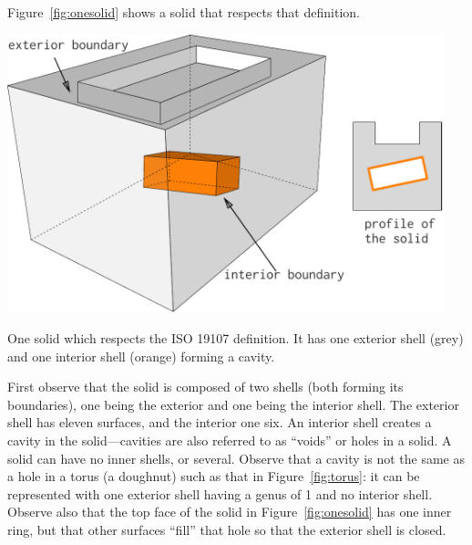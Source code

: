 Figure~\ref{fig:onesolid} shows a solid that respects that definition.
\begin{marginfigure}
  \centering
  \includegraphics[width=0.95\textwidth]{figs/isosolid.pdf}
  \caption{One solid which respects the ISO 19107 definition. It has one exterior shell (grey) and one interior shell (orange) forming a cavity.}%
\label{fig:onesolid}
\end{marginfigure}
First observe that the solid is composed of two shells (both forming its boundaries), one being the exterior and one being the interior shell.
The exterior shell has eleven surfaces, and the interior one six.
An interior shell creates a cavity in the solid---cavities are also referred to as ``voids'' or holes in a solid.
A solid can have no inner shells, or several.
Observe that a cavity is not the same as a hole in a torus (a doughnut) such as that in Figure~\ref{fig:torus}: it can be represented with one exterior shell having a genus of 1 and no interior shell.
Observe also that the top face of the solid in Figure~\ref{fig:onesolid} has one inner ring, but that other surfaces ``fill'' that hole so that the exterior shell is closed.
